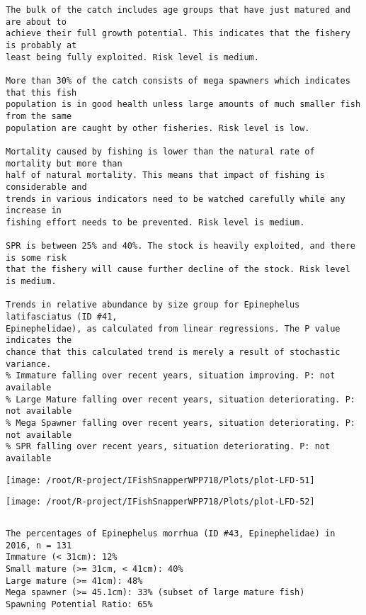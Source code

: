 \documentclass{report}\usepackage[]{graphicx}\usepackage[]{color}
\makeatletter
\def\maxwidth{ %
  \ifdim\Gin@nat@width>\linewidth
    \linewidth
  \else
    \Gin@nat@width
  \fi
}
\newenvironment{kframe}{%
 \def\at@end@of@kframe{}%
 \ifinner\ifhmode%
  \def\at@end@of@kframe{\end{minipage}}%
  \begin{minipage}{\columnwidth}%
 \fi\fi%
 \def\FrameCommand##1{\hskip\@totalleftmargin \hskip-\fboxsep
 \colorbox{shadecolor}{##1}\hskip-\fboxsep
     \hskip-\linewidth \hskip-\@totalleftmargin \hskip\columnwidth}%
 \MakeFramed {\advance\hsize-\width
   \@totalleftmargin\z@ \linewidth\hsize
   \@setminipage}}%
 {\par\unskip\endMakeFramed%
 \at@end@of@kframe}
\newenvironment{knitrout}{}{} %
\makeatother
\begin{document}
\begin{knitrout}
\begin{kframe}
\begin{verbatim}
The bulk of the catch includes age groups that have just matured and are about to
achieve their full growth potential. This indicates that the fishery is probably at
least being fully exploited. Risk level is medium.

More than 30% of the catch consists of mega spawners which indicates that this fish
population is in good health unless large amounts of much smaller fish from the same
population are caught by other fisheries. Risk level is low.
 
Mortality caused by fishing is lower than the natural rate of mortality but more than
half of natural mortality. This means that impact of fishing is considerable and
trends in various indicators need to be watched carefully while any increase in
fishing effort needs to be prevented. Risk level is medium.
 
SPR is between 25% and 40%. The stock is heavily exploited, and there is some risk
that the fishery will cause further decline of the stock. Risk level is medium.
 
Trends in relative abundance by size group for Epinephelus latifasciatus (ID #41,
Epinephelidae), as calculated from linear regressions. The P value indicates the
chance that this calculated trend is merely a result of stochastic variance.
% Immature falling over recent years, situation improving. P: not available
% Large Mature falling over recent years, situation deteriorating. P: not available
% Mega Spawner falling over recent years, situation deteriorating. P: not available
% SPR falling over recent years, situation deteriorating. P: not available
\end{verbatim}
\end{kframe}
\texttt{[image: /root/R-project/IFishSnapperWPP718/Plots/plot-LFD-51]} 

\texttt{[image: /root/R-project/IFishSnapperWPP718/Plots/plot-LFD-52]} 
\begin{kframe}\begin{verbatim}
\end{verbatim}
\end{kframe}
\clearpage
\newpage
\begin{kframe}\begin{verbatim}The percentages of Epinephelus morrhua (ID #43, Epinephelidae) in 2016, n = 131
Immature (< 31cm): 12%
Small mature (>= 31cm, < 41cm): 40%
Large mature (>= 41cm): 48%
Mega spawner (>= 45.1cm): 33% (subset of large mature fish)
Spawning Potential Ratio: 65%
 

\end{verbatim}
\end{kframe}
\end{knitrout}
\end{document}
